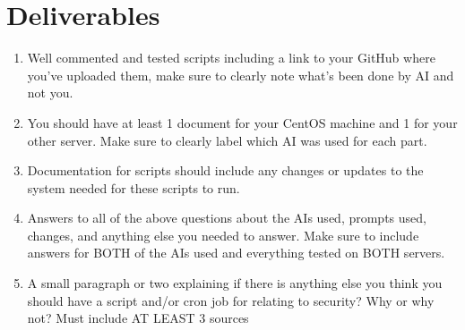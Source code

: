 \documentclass[12pt]{article}
\begin{document}
\section*{Deliverables}
\begin{enumerate}

    \item Well commented and tested scripts including a link to your GitHub where you've uploaded them, make sure to clearly note what's been done by AI and not you.
    \item You should have at least 1 document for your CentOS machine and 1 for your other server.  Make sure to clearly label which AI was used for each part.
    \item  Documentation for scripts should include any changes or updates to the system needed for these scripts to run.
    \item Answers to all of the above questions about the AIs used, prompts used, changes, and anything else you needed to answer. Make sure to include answers for BOTH of the AIs used and everything tested on BOTH servers.
    \item A small paragraph or two explaining if there is anything else you think you should have a script and/or cron job for relating to security?  Why or why not?  Must include AT LEAST 3 sources

\end{enumerate}    
\end{document}
